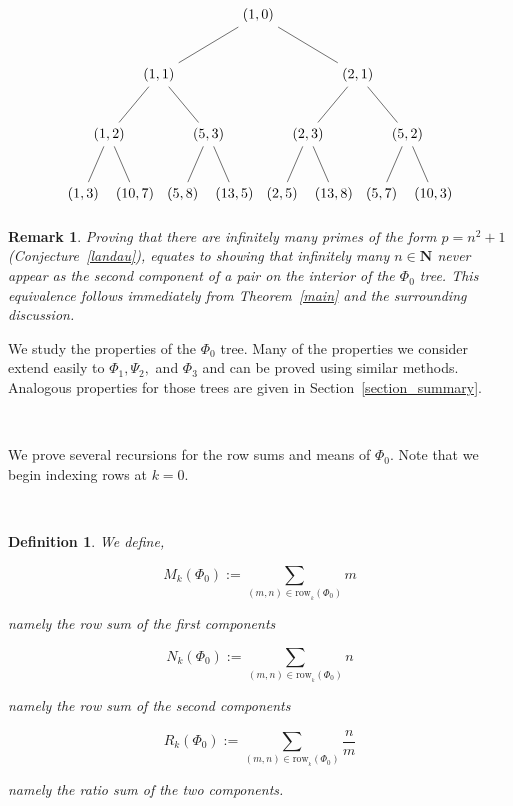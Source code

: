 \documentclass{article}
\newtheorem{definition}[theorem]{Definition}  %
\newtheorem{remark}[theorem]{Remark}  %
\begin{document}
$$
\begin{tikzpicture}[level distance=15mm, 
                    level 1/.style={sibling distance=50mm},
                    level 2/.style={sibling distance=25mm},
                    level 3/.style={sibling distance=13mm}]
  \node {\((1, 0)\)}
    child {
      node {\((1, 1)\)} 
      child {
        node {\((1, 2)\)}
        child {node {\((1, 3)\)}}
        child {node {\((10, 7)\)}}
      }
      child {
        node {\((5, 3)\)}
        child {node {\((5, 8)\)}}
        child {node {\((13, 5)\)}}
      }
    }
    child {
      node {\((2, 1)\)}
      child {
        node {\((2, 3)\)}
        child {node {\((2, 5)\)}}
        child {node {\((13, 8)\)}}
      }
      child {
        node {\((5, 2)\)}
        child {node {\((5, 7)\)}}
        child {node {\((10, 3)\)}}
      } 
    };
\end{tikzpicture}
$$


\begin{remark}\label{landauremark}
Proving that there are infinitely many primes of the form $p = n^2 + 1$ (Conjecture~\ref{landau}), equates to showing that infinitely many $n \in \mathbf{N}$ never appear as the second component of a pair on the interior of the $\Phi_0$ tree. This equivalence follows immediately from Theorem~\ref{main} and the surrounding discussion.
\end{remark}

We study the properties of the $\Phi_0$ tree. Many of the properties we consider extend easily to $\Phi_1, \Psi_2,$ and $\Phi_3$ and can be proved using similar methods. Analogous properties for those trees are given in Section~\ref{section_summary}.

\

We prove several recursions for the row sums and means of $\Phi_0$. Note that we begin indexing rows at $k = 0$.

\

\begin{definition}\label{sumsandavgsdefns}
We define, 

$$M_k(\Phi_0) := \sum_{(m, n) \in \text{row}_{_k}(\Phi_0)} m$$

namely the row sum of the first components

$$N_k(\Phi_0) := \sum_{(m, n) \in \text{row}_{_k}(\Phi_0)} n$$

namely the row sum of the second components

$$R_k(\Phi_0) := \sum_{(m, n) \in \text{row}_{_k}(\Phi_0)} \frac{n}{m}$$

namely the ratio sum of the two components.
\end{definition}
\end{document}
